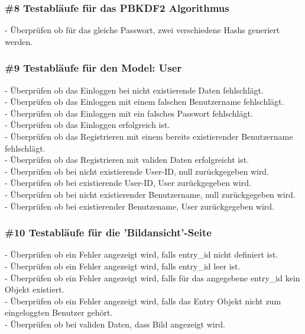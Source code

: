 \subsubsection*{\#8 Testabläufe für das PBKDF2 Algorithmus}
- Überprüfen ob für das gleiche Passwort, zwei verschiedene Hashs generiert werden.

\subsubsection*{\#9 Testabläufe für den Model: User}
- Überprüfen ob das Einloggen bei nicht existierende Daten fehlschlägt.\\
- Überprüfen ob das Einloggen mit einem falschen Benutzername fehlschlägt.\\
- Überprüfen ob das Einloggen mit ein falsches Passwort fehlschlägt.\\
- Überprüfen ob das Einloggen erfolgreich ist.\\
- Überprüfen ob das Registrieren mit einem bereits existierender Benutzername fehlschlägt.\\
- Überprüfen ob das Registrieren mit validen Daten erfolgreicht ist.\\
- Überprüfen ob bei nicht existierende User-ID, null zurückgegeben wird.\\
- Überprüfen ob bei existierende User-ID, User zurückgegeben wird.\\
- Überprüfen ob bei nicht existierender Benutzername, null zurückgegeben wird.\\
- Überprüfen ob bei existierender Benutzename, User zurückgegeben wird.

\subsubsection*{\#10 Testabläufe für die 'Bildansicht'-Seite}
- Überprüfen ob ein Fehler angezeigt wird, falls entry\_id nicht definiert ist.\\
- Überprüfen ob ein Fehler angezeigt wird, falls entry\_id leer ist.\\
- Überprüfen ob ein Fehler angezeigt wird, falls für das angegebene entry\_id kein Objekt existiert.\\
- Überprüfen ob ein Fehler angezeigt wird, falls das Entry Objekt nicht zum eingeloggten Benutzer gehört.\\
- Überprüfen ob bei validen Daten, dass Bild angezeigt wird.